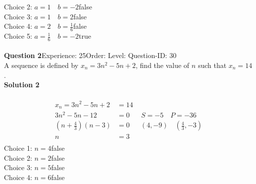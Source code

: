 \documentclass{article}
\begin{document}
Choice 2: \hspace{20pt}$a=1 \quad b=-2$\hspace{20pt}false\\
Choice 3: \hspace{20pt}$a=1 \quad b=2$\hspace{20pt}false\\
Choice 4: \hspace{20pt}$a=2 \quad b=\displaystyle\frac{1}{6}$\hspace{20pt}false\\
Choice 5: \hspace{20pt}$a=\displaystyle\frac{1}{6} \quad b=-2$\hspace{20pt}true\\
\\[4pt]
\noindent\textbf{Question 2}\hspace{20pt}Experience: 25\hspace{20pt}Order: \hspace{20pt}Level: \hspace{20pt}Question-ID: 30\\[2pt]
A sequence is defined by $x_n=3n^2-5n+2$, find the value of $n$ such that $x_n=14$.\\[4pt]
\noindent\textbf{Solution 2}\\[2pt]
\\[-35pt]\begin{align*}
x_n=3n^2-5n+2&=14\\[2pt]
3n^2-5n-12&=0 \hspace{20pt} S=-5 \quad P=-36\\[2pt]
\left(n+\displaystyle\frac{4}{3}\right)(n-3)&=0 \hspace{19pt} (4,-9) \quad \left(\displaystyle\frac{4}{3},-3\right)\\[2pt]
n&=3\\
\end{align*}
Choice 1: \hspace{20pt}$n=4$\hspace{20pt}false\\
Choice 2: \hspace{20pt}$n=2$\hspace{20pt}false\\
Choice 3: \hspace{20pt}$n=5$\hspace{20pt}false\\
Choice 4: \hspace{20pt}$n=6$\hspace{20pt}false\\
\end{document}
